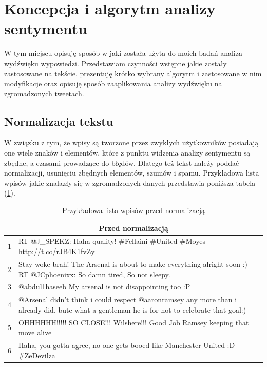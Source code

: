 \section{Koncepcja i algorytm analizy sentymentu}
\label{section:koncepcjaialgorytmanalizysentymentu}

W tym miejscu opisuję sposób w jaki została użyta do moich badań analiza
wydźwięku wypowiedzi. Przedstawiam czynności wstępne jakie zostały zastosowane
na tekście, prezentuję krótko wybrany algorytm i zastosowane w nim modyfikacje
oraz opisuję sposób zaaplikowania analizy wydźwięku na zgromadzonych tweetach.

\subsection{Normalizacja tekstu}
\label{subsection:normalizacjatekstu}

W związku z tym, że wpisy są tworzone przez zwykłych użytkowników posiadają one
wiele znaków i elementów, które z punktu widzenia analizy sentymentu są zbędne,
a czasami prowadzące do błędów. Dlatego też tekst należy poddać normalizacji,
usunięciu zbędnych elementów, szumów i spamu. Przykładowa lista wpisów jakie
znalazły się w zgromadzonych danych przedstawia poniższa tabela
(\ref{tab:wpisy-przed-normalizacja}).


\begin{table}[ht!]  
\begin{center}  
\begin{tabular}{|r|p{140mm}|}
\hline
\multicolumn{2}{|c|}{Przed normalizacją}
\\ \hline
1 & RT @J\_SPEKZ: Haha quality! \#Fellaini \#United \#Moyes
http://t.co/rJB4K1fvZy
\\ \hline
2 & Stay woke brah! The Arsenal is about to make everything alright soon :) RT
@JCphoenixx: So damn tired, So not sleepy.
\\ \hline
3 & @abdul1haseeb My arsenal is not disappointing too :P 
\\ \hline
4 & @Arsenal didn't think i could respect @aaronramsey any more than i already
did, bute what a gentleman he is for not to celebrate that goal:) 
\\ \hline
5 & OHHHHHH!!!!! SO CLOSE!!! Wilshere!!! Good Job Ramsey keeping that move alive
\\ \hline
6 & Haha, you gotta agree, no one gets booed like Manchester United :D \#ZeDevilza
\\
\hline
\end{tabular} 
\end{center} 
\caption{Przykładowa lista wpisów przed normalizacją}
\label{tab:wpisy-przed-normalizacja}
\end{table}



